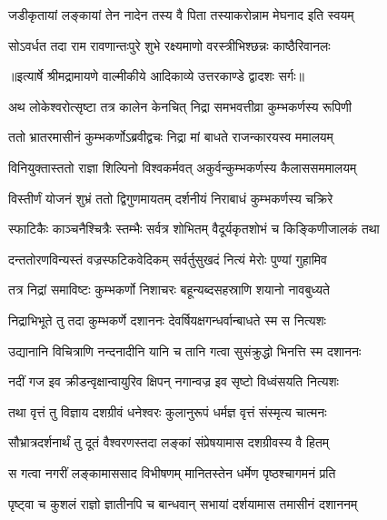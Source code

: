 \twolineshloka
{जडीकृतायां लङ्कायां तेन नादेन तस्य वै}
{पिता तस्याकरोन्नाम मेघनाद इति स्वयम्} %

\twolineshloka
{सोऽवर्धत तदा राम रावणान्तःपुरे शुभे}
{रक्ष्यमाणो वरस्त्रीभिश्छन्नः काष्ठैरिवानलः} %


{॥इत्यार्षे श्रीमद्रामायणे वाल्मीकीये आदिकाव्ये उत्तरकाण्डे द्वादशः सर्गः॥}


\twolineshloka
{अथ लोकेश्वरोत्सृष्टा तत्र कालेन केनचित्}
{निद्रा समभवत्तीव्रा कुम्भकर्णस्य रूपिणी} %

\twolineshloka
{ततो भ्रातरमासीनं कुम्भकर्णोऽब्रवीद्वचः}
{निद्रा मां बाधते राजन्कारयस्व ममालयम्} %

\twolineshloka
{विनियुक्तास्ततो राज्ञा शिल्पिनो विश्वकर्मवत्}
{अकुर्वन्कुम्भकर्णस्य कैलाससममालयम्} %

\twolineshloka
{विस्तीर्णं योजनं शुभ्रं ततो द्विगुणमायतम्}
{दर्शनीयं निराबाधं कुम्भकर्णस्य चक्रिरे} %

\twolineshloka
{स्फाटिकैः काञ्चनैश्चित्रैः स्तम्भैः सर्वत्र शोभितम्}
{वैदूर्यकृतशोभं च किङ्किणीजालकं तथा} %

\twolineshloka
{दन्ततोरणविन्यस्तं वज्रस्फटिकवेदिकम्}
{सर्वर्तुसुखदं नित्यं मेरोः पुण्यां गुहामिव} %

\twolineshloka
{तत्र निद्रां समाविष्टः कुम्भकर्णो निशाचरः}
{बहून्यब्दसहस्राणि शयानो नावबुध्यते} %

\twolineshloka
{निद्राभिभूते तु तदा कुम्भकर्णे दशाननः}
{देवर्षियक्षगन्धर्वान्बाधते स्म स नित्यशः} %

\twolineshloka
{उद्यानानि विचित्राणि नन्दनादीनि यानि च}
{तानि गत्वा सुसंक्रुद्धो भिनत्ति स्म दशाननः} %

\twolineshloka
{नदीं गज इव क्रीडन्वृक्षान्वायुरिव क्षिपन्}
{नगान्वज्र इव सृष्टो विध्वंसयति नित्यशः} %

\twolineshloka
{तथा वृत्तं तु विज्ञाय दशग्रीवं धनेश्वरः}
{कुलानुरूपं धर्मज्ञ वृत्तं संस्मृत्य चात्मनः} %

\twolineshloka
{सौभ्रात्रदर्शनार्थं तु दूतं वैश्वरणस्तदा}
{लङ्कां संप्रेषयामास दशग्रीवस्य वै हितम्} %

\twolineshloka
{स गत्वा नगरीं लङ्कामाससाद विभीषणम्}
{मानितस्तेन धर्मेण पृष्ठश्चागमनं प्रति} %

\twolineshloka
{पृष्ट्वा च कुशलं राज्ञो ज्ञातीनपि च बान्धवान्}
{सभायां दर्शयामास तमासीनं दशाननम्} %


